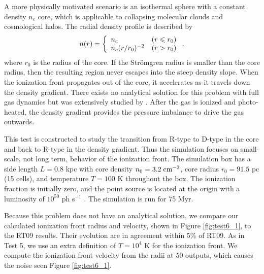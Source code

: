 \documentclass[useAMS,usenatbib]{mn2e}
\begin{document}
A more physically motivated scenario is an isothermal sphere with a
constant density $n_c$ core, which is applicable to collapsing
molecular clouds and cosmological halos.  The radial density profile
is described by
%
\begin{equation}
  \label{eqn:test6_rho}
  n(r) = \left\{ \begin{array}{l@{\quad}l}
      n_c & (r \le r_0)\\
      n_c (r/r_0)^{-2} & (r > r_0)
    \end{array} \right. ,
\end{equation}
where $r_0$ is the radius of the core.  If the Str\"{o}mgren radius is
smaller than the core radius, then the resulting \hii region
never escapes into the steep density slope.  When the ionization front
propagates out of the core, it accelerates as it travels down the
density gradient.  There exists no analytical solution for this
problem with full gas dynamics but was extensively studied by
\citet{Franco90}.  After the gas is ionized and photo-heated, the
density gradient provides the pressure imbalance to drive the gas
outwards.

This test is constructed to study the transition from R-type to D-type
in the core and back to R-type in the density gradient.  Thus the
simulation focuses on small-scale, not long term, behavior of the
ionization front.  The simulation box has a side length $L = 0.8$ kpc
with core density $n_0 = 3.2\;\cubecm$, core radius $r_0 = 91.5$ pc
(15 cells), and temperature $T = 100$ K throughout the box.  The
ionization fraction is initially zero, and the point source is located
at the origin with a luminosity of $10^{50}$ ph s$^{-1}$ \cubecm.  The
simulation is run for 75 Myr.

Because this problem does not have an analytical solution, we compare
our calculated ionization front radius and velocity, shown in Figure
\ref{fig:test6_1}, to the RT09 results.  Their evolution are in
agreement within 5\% of RT09.  As in Test 5, we use an extra
definition of $T=10^4$ K for the ionization front.  We compute the
ionization front velocity from the radii at 50 outputs, which causes
the noise seen Figure \ref{fig:test6_1}.
\end{document}
